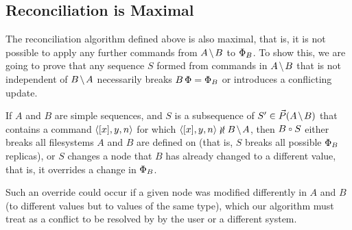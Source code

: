
\subsection{Reconciliation is Maximal}



The reconciliation algorithm defined above is also maximal, that is,
it is not possible to apply any further commands from $\ambnp$ to $\Phi_B$.
To show this, we are going to prove that any sequence $S$ formed from commands
in $\ambnp$ that is not independent of $\bmanp$ necessarily breaks $B\,\Phi=\Phi_B$
or introduces a conflicting update.

\begin{myth}
If $A$ and $B$ are simple sequences,
and $S$ is a subsequence of $S'\in\orderset{\ambnp}$ that
contains a command $\langle{[x],y,n}\rangle$ for which $\cxynv\nindep\bmanp$,
then $B\cc S$ either breaks all filesystems $A$ and $B$ are defined on
(that is, $S$ breaks all possible $\Phi_B$ replicas),
or $S$ changes a node that $B$ has already changed to a different value,
that is, it overrides a change in $\Phi_B$.
\end{myth}
Such an override could occur if a given node was modified differently in
$A$ and $B$ (to different values but to values of the same type), which 
our algorithm must treat as a conflict to be resolved by
by the user or a different system.
